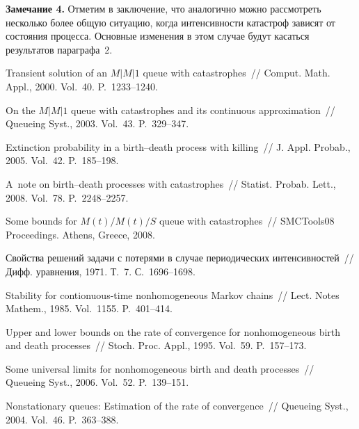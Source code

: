 \begin{multicols}{2}
\medskip

\noindent
\textbf{Замечание 4.}
Отметим в заключение,
что аналогично можно рассмотреть несколько более общую ситуацию,
когда интенсивности катастроф зависят от состояния процесса.
Основные изменения в этом случае будут касаться результатов
параграфа~2.

{\small\frenchspacing
{%
\begin{thebibliography}{99}

Transient solution of an
$M\vert M\vert 1$ queue with catastrophes~//  Comput. Math. Appl., 2000. Vol.~40. 
P.~1233--1240.

On the $M\vert M\vert 1$ queue with catastrophes and its continuous approximation~//
 Queueing Syst., 2003. Vol.~43. P.~329--347.
 
Extinction probability in a birth--death process with killing~// J.
Appl. Probab., 2005. Vol.~42. P.~185--198.

A~note on birth--death processes with catastrophes~//
Statist. Probab. Lett., 2008. Vol.~78. P.~2248--2257.


Some bounds for $M(t)/M(t)/S$ queue with catastrophes~// 
SMCTools08 Proceedings.  Athens, Greece, 2008.

Свойства решений задачи с потерями в случае периодических
интенсивностей~// Дифф. уравнения, 1971. Т.~7. С.~1696--1698.

Stability for contionuous-time
nonhomogeneous Markov chains~// Lect. Notes Mathem., 1985. Vol.~1155. P.~401--414.

Upper and lower bounds on the rate of
convergence for nonhomogeneous birth and death proc\-esses~// Stoch.
Proc.  Appl., 1995. Vol.~59. P.~157--173.

Some universal limits for nonhomogeneous birth and death processes~//
Queueing Syst., 2006. Vol.~52. P.~139--151.

\label{end\stat}

Nonstationary queues: Estimation of the rate of convergence~//
Queueing Syst.,  2004. Vol.~46. P.~363--388.


\end{thebibliography}
}
}
\end{multicols}